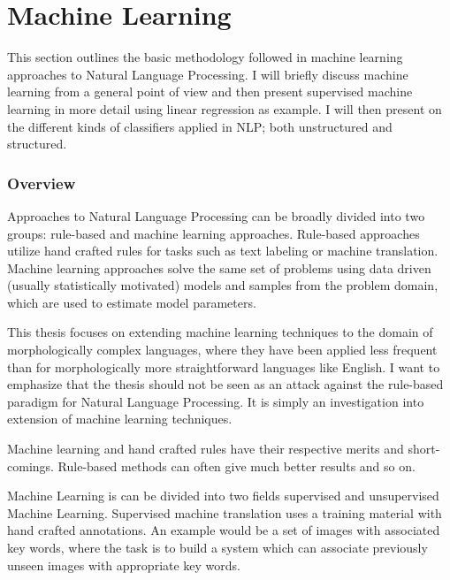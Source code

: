 \chapter{Machine Learning}

This section outlines the basic methodology followed in machine
learning approaches to Natural Language Processing. I will briefly
discuss machine learning from a general point of view and then present
supervised machine learning in more detail using linear regression as
example. I will then present on the different kinds of classifiers
applied in NLP; both unstructured and structured.

\subsection{Overview}

Approaches to Natural Language Processing can be broadly divided into
two groups: rule-based and machine learning approaches. Rule-based
approaches utilize hand crafted rules for tasks such as text labeling
or machine translation. Machine learning approaches solve the same set
of problems using data driven (usually statistically motivated) models
and samples from the problem domain, which are used to estimate model
parameters.

This thesis focuses on extending machine learning techniques to the
domain of morphologically complex languages, where they have been
applied less frequent than for morphologically more straightforward
languages like English. I want to emphasize that the thesis should not
be seen as an attack against the rule-based paradigm for Natural
Language Processing. It is simply an investigation into extension of
machine learning techniques.

Machine learning and hand crafted rules have their respective merits
and short-comings. Rule-based methods can often give much better
results and so on.

Machine Learning is can be divided into two fields supervised and
unsupervised Machine Learning. Supervised machine translation uses a
training material with hand crafted annotations. An example would be a
set of images with associated key words, where the task is to build a
system which can associate previously unseen images with appropriate
key words.


